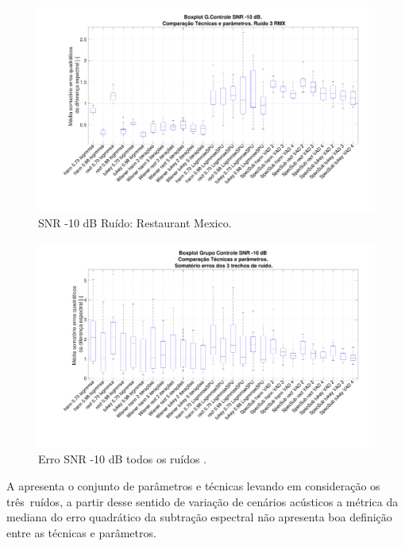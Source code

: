 \begin{figure}[H]
\centering
\includegraphics[width=16cm]{Figs/Erro_m10_Ruido3.pdf}
\caption{SNR -10 dB Ruído: Restaurant Mexico.}
\label{m10_3}
\end{figure}

\begin{figure}[H]
\centering
\includegraphics[width=16cm]{Figs/Erro_m10_Ruidos.pdf}
\caption{Erro SNR -10 dB todos os ruídos .}
\label{m10_3r}
\end{figure}

A  apresenta o conjunto de parâmetros e técnicas levando em consideração os três~ruídos, a partir desse sentido de variação de cenários acústicos a métrica da mediana do erro quadrático da subtração espectral não apresenta boa definição entre as técnicas e parâmetros.

